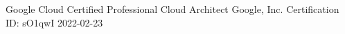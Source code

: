 \awarditem
    {Google Cloud Certified Professional Cloud Architect}
    {Google, Inc.}
    {Certification ID: sO1qwI}
    {2022-02-23}
